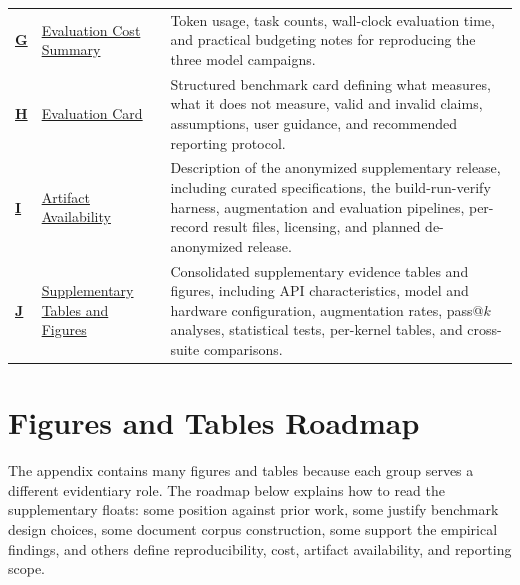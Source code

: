 \begin{center}
\begin{tabularx}{0.98\textwidth}{@{}
>{\bfseries}p{}
>{\RaggedRight\arraybackslash}p{\appendixsectionwidth}
X
@{}}
\hyperref[sec:appendix-j]{G}
& \hyperref[sec:appendix-j]{Evaluation Cost Summary}
& Token usage, task counts, wall-clock evaluation time, and practical budgeting notes for reproducing
the three model campaigns. \\

\hyperref[sec:appendix-k]{H}
& \hyperref[sec:appendix-k]{Evaluation Card}
& Structured benchmark card defining what \parbench{} measures, what it does not measure,
valid and invalid claims, assumptions, user guidance, and recommended reporting protocol. \\

\hyperref[sec:artifact-availability]{I}
& \hyperref[sec:artifact-availability]{Artifact Availability}
& Description of the anonymized supplementary release, including curated specifications,
the build-run-verify harness, augmentation and evaluation pipelines, per-record result files,
licensing, and planned de-anonymized release. \\

\hyperref[sec:appendix-f]{J}
& \hyperref[sec:appendix-f]{Supplementary Tables and Figures}
& Consolidated supplementary evidence tables and figures, including API characteristics, model and hardware configuration, augmentation rates, pass@$k$ analyses, statistical tests, per-kernel tables, and cross-suite comparisons. \\

\bottomrule
\end{tabularx}
\end{center}


\newpage
\vspace{1.0em}
\section*{Figures and Tables Roadmap}
\label{sec:appendix-float-roadmap}

The appendix contains many figures and tables because each group serves a different
evidentiary role. The roadmap below explains how to read the supplementary floats:
some position \parbench{} against prior work, some justify benchmark design choices,
some document corpus construction, some support the empirical findings, and others
define reproducibility, cost, artifact availability, and reporting scope.

